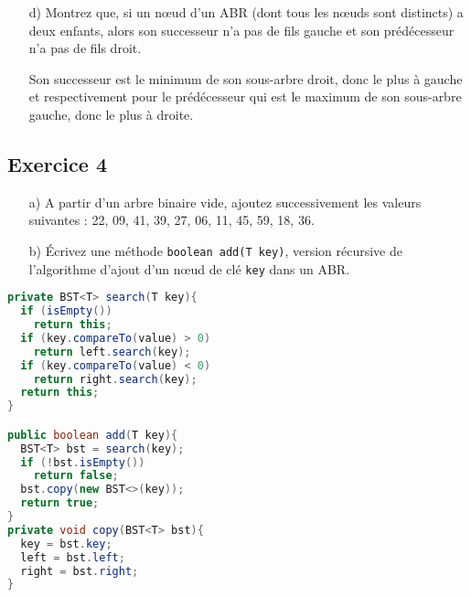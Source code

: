 \documentclass[iutinfo,a4paper,10pt]{ustl-tdtp}
\begin{document}
\begin{enumerate}

\item [d)] Montrez que, si un n\oe ud d'un ABR (dont tous les n\oe uds sont distincts) a deux enfants, alors son successeur n'a pas de fils gauche et
 son prédécesseur n'a pas de fils droit.
 
\begin{solution}
{\color{red}
Son successeur est le minimum de son sous-arbre droit, donc le plus à gauche et respectivement pour le prédécesseur qui est le maximum de son sous-arbre gauche, donc le plus à droite.
}
 \end{solution}

\end{enumerate}


\subsection*{Exercice 4}

\begin{enumerate}
\item [a)] A partir d'un arbre binaire vide, ajoutez successivement les valeurs suivantes : 22, 09, 41, 39, 27, 06, 11, 45, 59, 18, 36.



\item [b)]Écrivez une méthode \texttt{boolean add(T key)},
  version récursive de l'algorithme d'ajout d'un n\oe ud de clé \texttt{key} dans un ABR.
\end{enumerate}

\begin{solution}
{\color{red}
\begin{lstlisting}[language=Java]
private BST<T> search(T key){
  if (isEmpty()) 
    return this;
  if (key.compareTo(value) > 0) 
    return left.search(key);
  if (key.compareTo(value) < 0) 
    return right.search(key);
  return this;
}

public boolean add(T key){
  BST<T> bst = search(key);
  if (!bst.isEmpty())
    return false;
  bst.copy(new BST<>(key));
  return true;
}
private void copy(BST<T> bst){
  key = bst.key;
  left = bst.left;
  right = bst.right;
}	
\end{lstlisting}

}
\end{solution}
\end{document}
